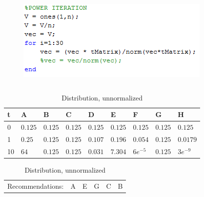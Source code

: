 \begin{frame}
\begin{table}
\begin{columns}
\begin{column}{0.6\textwidth}
			\begin{figure}
				\centering
				\includegraphics[scale=.6]{graphics/poweriteration.png}
			\end{figure}
		\end{column}
	\end{columns}
	\footnotesize
	\begin{table}
		\begin{tabular}{|l|llllllll|}\hline
			t & A & B & C & D & E & F & G & H \\ \hline
			0 & $0.125$ & $0.125$ & $0.125$ & $0.125$ & $0.125$ & $0.125$ & $0.125$ & $0.125$ \\
			1 & $0.25$ & $0.125$ & $0.125$ & $0.107$ & $0.196$ & $0.054$ & $0.125$ & $0.0179$ \\
			10& $64$ & $0.125$ & $0.125$ & $0.031$ & $7.304$ & $6e^{-5}$ & $0.125$ & $3e^{-9}$ \\ \hline
		\end{tabular}
		\caption{Distribution, unnormalized}
	\end{table}
	\begin{tabular}{llllll}
		Recommendations: & A & E & G & C & B
	\end{tabular}
\end{table}
\end{frame}

%
%
%

